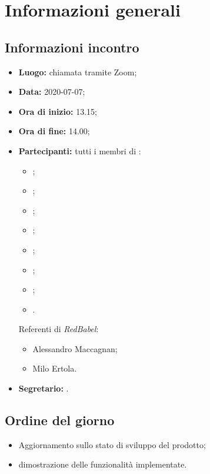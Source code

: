 \section{Informazioni generali}
\subsection{Informazioni incontro}
\begin{itemize}
	\item \textbf{Luogo:} chiamata tramite Zoom;
	\item \textbf{Data:} 2020-07-07;
	\item \textbf{Ora di inizio:} 13.15;
	\item \textbf{Ora di fine:} 14.00;
	\item \textbf{Partecipanti:}
		tutti i membri di \Gruppo:
		\begin{itemize}
			\item \VB;
			\item \LB;
			\item \NF;
			\item \EG;
			\item \FJ;
			\item \MP;
			\item \AS;
			\item \AZ.
		\end{itemize}
		
		Referenti di \textit{RedBabel}:
		\begin{itemize}
			\item Alessandro Maccagnan;
			\item Milo Ertola.
		\end{itemize}
	\item \textbf{Segretario:} \EG.
\end{itemize}

\subsection{Ordine del giorno}
\begin{itemize}
	\item Aggiornamento sullo stato di sviluppo del prodotto; 
	\item dimostrazione delle funzionalità implementate. 
\end{itemize}
